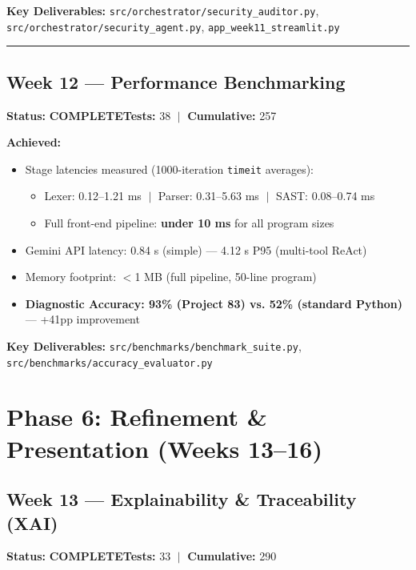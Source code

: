 \documentclass[a4paper,11pt]{article}
\newcommand{\done}{\colorbox{green!25}{\textbf{\small COMPLETE}}}
\begin{document}
\textbf{Key Deliverables:} \texttt{src/orchestrator/security\_auditor.py}, \texttt{src/orchestrator/security\_agent.py}, \texttt{app\_week11\_streamlit.py}

\vspace{4pt}\hrule\vspace{6pt}

\subsection{Week 12 --- Performance Benchmarking}

\textbf{Status:} \done \hfill \textbf{Tests:} 38 $\;|\;$ \textbf{Cumulative:} 257

\textbf{Achieved:}
\begin{itemize}[leftmargin=*, itemsep=1pt]
    \item Stage latencies measured (1000-iteration \texttt{timeit} averages):
    \begin{itemize}
        \item Lexer: 0.12--1.21 ms $\;|\;$ Parser: 0.31--5.63 ms $\;|\;$ SAST: 0.08--0.74 ms
        \item Full front-end pipeline: \textbf{under 10 ms} for all program sizes
    \end{itemize}
    \item Gemini API latency: 0.84 s (simple) --- 4.12 s P95 (multi-tool ReAct)
    \item Memory footprint: $<$1 MB (full pipeline, 50-line program)
    \item \textbf{Diagnostic Accuracy: 93\% (Project 83) vs. 52\% (standard Python)} --- +41pp improvement
\end{itemize}

\textbf{Key Deliverables:} \texttt{src/benchmarks/benchmark\_suite.py}, \texttt{src/benchmarks/accuracy\_evaluator.py}

\section{Phase 6: Refinement \& Presentation (Weeks 13--16)}

\subsection{Week 13 --- Explainability \& Traceability (XAI)}

\textbf{Status:} \done \hfill \textbf{Tests:} 33 $\;|\;$ \textbf{Cumulative:} 290
\end{document}
